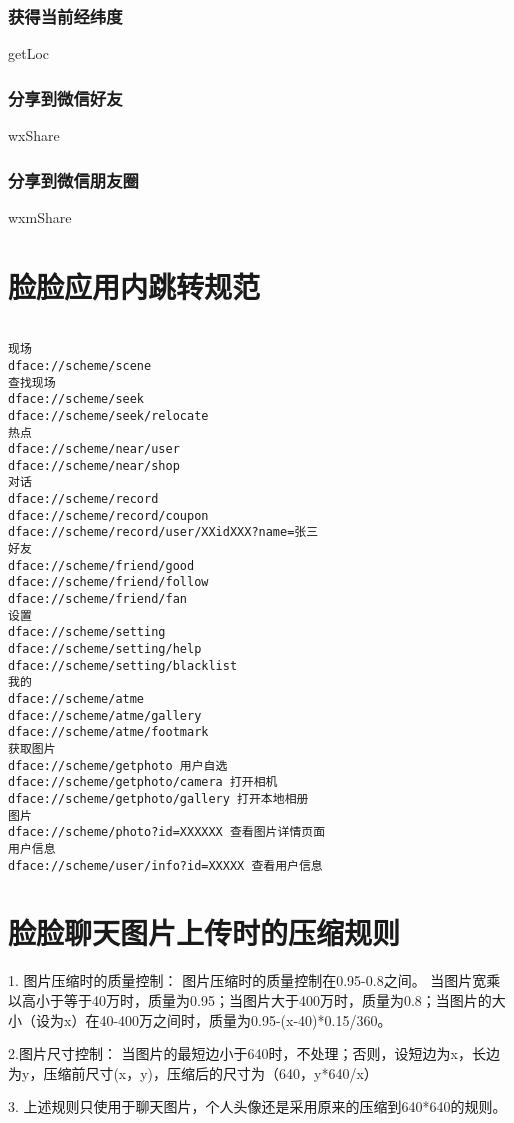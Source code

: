 \documentclass[cs4size]{ctexartutf8}
\begin{document}
\subsubsection{获得当前经纬度}
getLoc

\subsubsection{分享到微信好友}
wxShare

\subsubsection{分享到微信朋友圈}
wxmShare


\section{脸脸应用内跳转规范}
\begin{verbatim}

现场
dface://scheme/scene
查找现场
dface://scheme/seek
dface://scheme/seek/relocate
热点
dface://scheme/near/user
dface://scheme/near/shop
对话
dface://scheme/record
dface://scheme/record/coupon
dface://scheme/record/user/XXidXXX?name=张三
好友
dface://scheme/friend/good
dface://scheme/friend/follow
dface://scheme/friend/fan
设置
dface://scheme/setting
dface://scheme/setting/help
dface://scheme/setting/blacklist
我的
dface://scheme/atme
dface://scheme/atme/gallery
dface://scheme/atme/footmark
获取图片
dface://scheme/getphoto 用户自选
dface://scheme/getphoto/camera 打开相机
dface://scheme/getphoto/gallery 打开本地相册
图片
dface://scheme/photo?id=XXXXXX 查看图片详情页面
用户信息
dface://scheme/user/info?id=XXXXX 查看用户信息
\end{verbatim}


\section{脸脸聊天图片上传时的压缩规则}

1. 图片压缩时的质量控制：
图片压缩时的质量控制在0.95-0.8之间。
当图片宽乘以高小于等于40万时，质量为0.95；当图片大于400万时，质量为0.8；当图片的大小（设为x）在40-400万之间时，质量为0.95-(x-40)*0.15/360。

2.图片尺寸控制：
当图片的最短边小于640时，不处理；否则，设短边为x，长边为y，压缩前尺寸(x，y)，压缩后的尺寸为（640，y*640/x）

3. 上述规则只使用于聊天图片，个人头像还是采用原来的压缩到640*640的规则。
\end{document}
